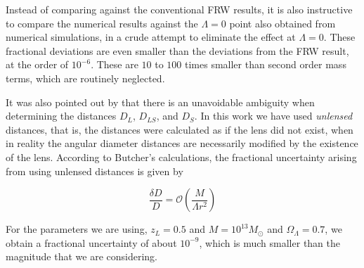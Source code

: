 Instead of comparing against the conventional FRW results, it is also instructive to compare the numerical results against the $\Lambda = 0$ point also obtained from numerical simulations, in a crude attempt to eliminate the effect at $\Lambda = 0$. These fractional deviations are even smaller than the deviations from the FRW result, at the order of $10^{-6}$. These are $10$ to $100$ times smaller than second order mass terms, which are routinely neglected. 

It was also pointed out by \citet{butcher2016no} that there is an unavoidable ambiguity when determining the distances $D_L$, $D_{LS}$, and $D_S$. In this work we have used \emph{unlensed} distances, that is, the distances were calculated as if the lens did not exist, when in reality the angular diameter distances are necessarily modified by the existence of the lens. According to Butcher's calculations, the fractional uncertainty arising from using unlensed distances is given by

\begin{equation}
  \frac{\delta D}{D} = \mathcal{O}\left (\frac{M}{\Lambda r^2} \right )
\end{equation}

For the parameters we are using, $z_L = 0.5$ and $M = 10^{13} M_{\odot}$ and $\Omega_{\Lambda} = 0.7$, we obtain a fractional uncertainty of about $10^{-9}$, which is much smaller than the magnitude that we are considering. 

